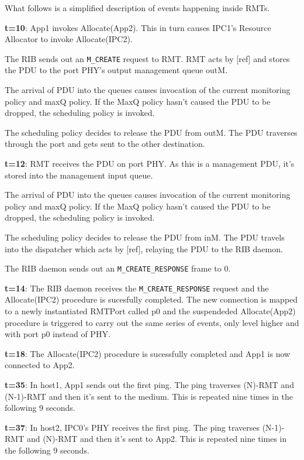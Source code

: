             What follows is a simplified description of events happening inside RMTs.

            \textbf{t=10}: App1 invokes Allocate(App2). This in turn causes IPC1's Resource Allocator to invoke Allocate(IPC2).

                The RIB sends out an \texttt{M\_CREATE} request to RMT. RMT acts by [ref] and stores the PDU to the port PHY's output management queue outM.

                The arrival of PDU into the queues causes invocation of the current monitoring policy and maxQ policy. If the MaxQ policy hasn't caused the PDU to be dropped, the scheduling policy is invoked.

                The scheduling policy decides to release the PDU from outM. The PDU traverses through the port and gets sent to the other destination.

            \textbf{t=12}: RMT receives the PDU on port PHY. As this is a management PDU, it's stored into the management input queue.

                The arrival of PDU into the queues causes invocation of the current monitoring policy and maxQ policy. If the MaxQ policy hasn't caused the PDU to be dropped, the scheduling policy is invoked.

                The scheduling policy decides to release the PDU from inM. The PDU travels into the dispatcher which acts by [ref], relaying the PDU to the RIB daemon.

                The RIB daemon sends out an \texttt{M\_CREATE\_RESPONSE} frame to 0.

            \textbf{t=14}: The RIB daemon receives the \texttt{M\_CREATE\_RESPONSE} request and the Allocate(IPC2) procedure is sucesfully completed. The new connection is mapped to a newly instantiated RMTPort called p0 and the suspendeded Allocate(App2) procedure is triggered to carry out the same series of events, only level higher and with port p0 instead of PHY.

            \textbf{t=18}: The Allocate(IPC2) procedure is sucessfully completed and App1 is now connected to App2.

            \textbf{t=35}: In host1, App1 sends out the first ping. The ping traverses (N)-RMT and (N-1)-RMT and then it's sent to the medium. This is repeated nine times in the following 9 seconds.

            \textbf{t=37}: In host2, IPC0's PHY receives the first ping. The ping traverses (N-1)-RMT and (N)-RMT and then it's sent to App2. This is repeated nine times in the following 9 seconds.

